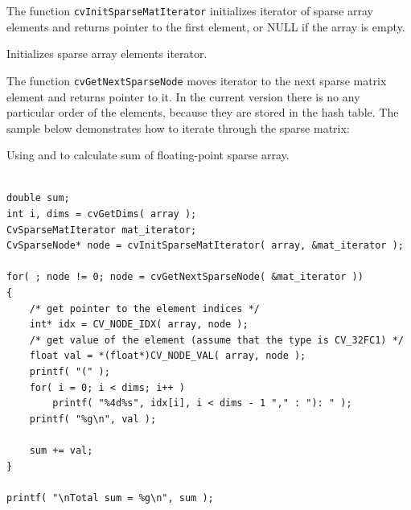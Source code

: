 \begin{description}
\end{description}

The function \texttt{cvInitSparseMatIterator} initializes iterator of
sparse array elements and returns pointer to the first element, or NULL
if the array is empty.

\label{GetNextSparseNode}

Initializes sparse array elements iterator.


\begin{description}
\end{description}


The function \texttt{cvGetNextSparseNode} moves iterator to the next sparse matrix element and returns pointer to it. In the current version there is no any particular order of the elements, because they are stored in the hash table. The sample below demonstrates how to iterate through the sparse matrix:

Using  and  to calculate sum of floating-point sparse array.

\begin{lstlisting}

double sum;
int i, dims = cvGetDims( array );
CvSparseMatIterator mat_iterator;
CvSparseNode* node = cvInitSparseMatIterator( array, &mat_iterator );

for( ; node != 0; node = cvGetNextSparseNode( &mat_iterator ))
{
    /* get pointer to the element indices */
    int* idx = CV_NODE_IDX( array, node );
    /* get value of the element (assume that the type is CV_32FC1) */
    float val = *(float*)CV_NODE_VAL( array, node );
    printf( "(" );
    for( i = 0; i < dims; i++ )
        printf( "%4d%s", idx[i], i < dims - 1 "," : "): " );
    printf( "%g\n", val );

    sum += val;
}

printf( "\nTotal sum = %g\n", sum );

\end{lstlisting}

\fi

\label{GetElemType}

